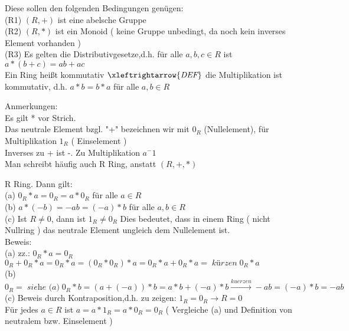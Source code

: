 \documentclass[headsepline,12pt,a4paper]{scrartcl}
\begin{document}
Diese sollen den folgenden Bedingungen genügen: \\
(R1) $(R,+)$ ist eine abelsche Gruppe \\
(R2) $ (R,*)$ ist ein Monoid ( keine Gruppe unbedingt, da noch kein inverses Element vorhanden ) \\
(R3) Es gelten die Distributivgesetze,d.h. für alle $a,b,c \in R $ ist \\
$a*(b+c) = ab+ac $ \\

Ein Ring heißt kommutativ $\xleftrightarrow{\textit{DEF}}$ die Multiplikation ist kommutativ, d.h. $a*b = b*a $ für alle $a,b \in R $ \\

\item Anmerkungen:\\
Es gilt * vor Strich.\\
Das neutrale Element bzgl. "+" bezeichnen wir mit $0_R$ (Nullelement), für Multiplikation $1_R$ ( Einselement ) \\
Inverses zu + ist -. Zu Multiplikation $ a^-1$ \\
Man schreibt häufig auch R Ring, anstatt $(R,+,*)$  \\

\item R Ring. Dann gilt:  \\
(a) $0_R * a = 0_R = a * 0_R $ für alle $ a \in R $ \\
(b) $a*(-b) = -ab = (-a)*b$ für alle $ a,b \in R $ \\
(c) Ist $R\neq 0 $, dann ist $1_R \neq 0_R$ Dies bedeutet, dass in einem Ring ( nicht Nullring ) das neutrale Element ungleich dem Nullelement ist.\\

Beweis:\\
(a) zz.:  $0_R * a = 0_R$ \\
$0_R + 0_R * a = 0_R * a = (0_R * 0_R) * a = 0_R * a + 0_R * a = \; \textit{kürzen} \; 0_R * a $ \\
(b) $ 0_R = \; \textit{siehe (a)} \; 0_R * b = (a+(-a)) * b = a*b + (-a )*b \xrightarrow{kuerzen} -ab = (-a)*b =-ab $\\
(c) Beweis durch Kontraposition,d.h. zu zeigen: $1_R = 0_R \rightarrow R = 0 $ \\
Für jedes $ a \in R $ ist $ a = a*1_R = a*0_R = 0_R $ ( Vergleiche (a) und Definition von neutralem bzw. Einselement ) \\
\end{document}
